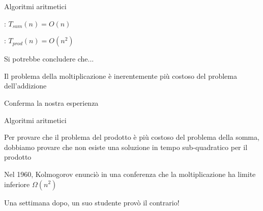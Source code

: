 \begin{frame}{Algoritmi aritmetici}

\vspace{-9pt}
\begin{myboxtitle}
\BI
\item {}: $T_{sum}(n) = O(n)$
\item {}: $T_{prod}(n) = O(n^2)$
\EI
\end{myboxtitle}

\bigskip
Si potrebbe concludere che...
\BI
\item Il problema della moltiplicazione è inerentemente più costoso del problema dell'addizione
\item Conferma la nostra esperienza
\EI

\end{frame}

\begin{frame}{Algoritmi aritmetici}

\vspace{-9pt}
\begin{myboxtitle}
Per provare che il problema del prodotto è più costoso del problema della somma, dobbiamo provare che \alert{non esiste} una soluzione in tempo sub-quadratico per il prodotto
\end{myboxtitle}


\begin{myboxtitle}[Un po' di storia]
\BI
\item Nel 1960, Kolmogorov enunciò in una conferenza che la moltiplicazione ha limite inferiore $\Omega(n^2)$
\item Una settimana dopo, un suo studente provò il contrario!
\EI
\end{myboxtitle}


\end{frame}

